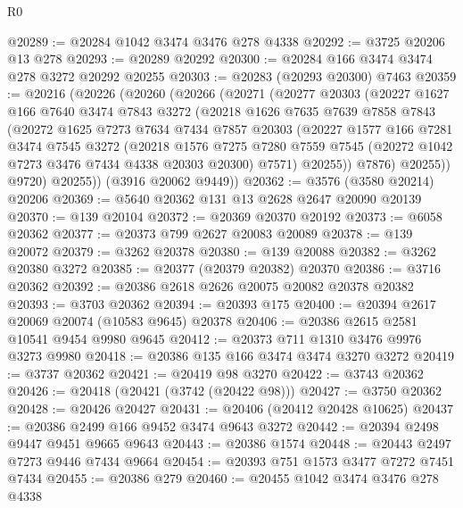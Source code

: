 \begin{lexlean}{R0}
\begin{coremodule}
@20289 := @20284 @1042 @3474 @3476 @278 @4338
@20292 := @3725 @20206 @13 @278
@20293 := @20289 @20292
@20300 := @20284 @166 @3474 @3474 @278 @3272 @20292 @20255
@20303 := @20283 (@20293 @20300) @7463
@20359 := @20216
    (@20226
      (@20260
        (@20266
          (@20271
            (@20277
              @20303
              (@20227
                @1627
                @166
                @7640
                @3474
                @7843
                @3272
                (@20218
                  @1626
                  @7635
                  @7639
                  @7858
                  @7843
                  (@20272
                    @1625
                    @7273
                    @7634
                    @7434
                    @7857
                    @20303
                    (@20227
                      @1577
                      @166
                      @7281
                      @3474
                      @7545
                      @3272
                      (@20218
                        @1576
                        @7275
                        @7280
                        @7559
                        @7545
                        (@20272 @1042 @7273 @3476 @7434 @4338 @20303 @20300)
                        @7571)
                      @20255))
                  @7876)
                @20255))
            @9720)
          @20255))
      (@3916 @20062 @9449))
@20362 := @3576 (@3580 @20214) @20206
@20369 := @5640 @20362 @131 @13 @2628 @2647 @20090 @20139
@20370 := @139 @20104
@20372 := @20369 @20370 @20192
@20373 := @6058 @20362
@20377 := @20373 @799 @2627 @20083 @20089
@20378 := @139 @20072
@20379 := @3262 @20378
@20380 := @139 @20088
@20382 := @3262 @20380 @3272
@20385 := @20377 (@20379 @20382) @20370
@20386 := @3716 @20362
@20392 := @20386 @2618 @2626 @20075 @20082 @20378 @20382
@20393 := @3703 @20362
@20394 := @20393 @175
@20400 := @20394 @2617 @20069 @20074 (@10583 @9645) @20378
@20406 := @20386 @2615 @2581 @10541 @9454 @9980 @9645
@20412 := @20373 @711 @1310 @3476 @9976 @3273 @9980
@20418 := @20386 @135 @166 @3474 @3474 @3270 @3272
@20419 := @3737 @20362
@20421 := @20419 @98 @3270
@20422 := @3743 @20362
@20426 := @20418 (@20421 (@3742 (@20422 @98)))
@20427 := @3750 @20362
@20428 := @20426 @20427
@20431 := @20406 (@20412 @20428 @10625)
@20437 := @20386 @2499 @166 @9452 @3474 @9643 @3272
@20442 := @20394 @2498 @9447 @9451 @9665 @9643
@20443 := @20386 @1574
@20448 := @20443 @2497 @7273 @9446 @7434 @9664
@20454 := @20393 @751 @1573 @3477 @7272 @7451 @7434
@20455 := @20386 @279
@20460 := @20455 @1042 @3474 @3476 @278 @4338

\end{coremodule}
\end{lexlean}
